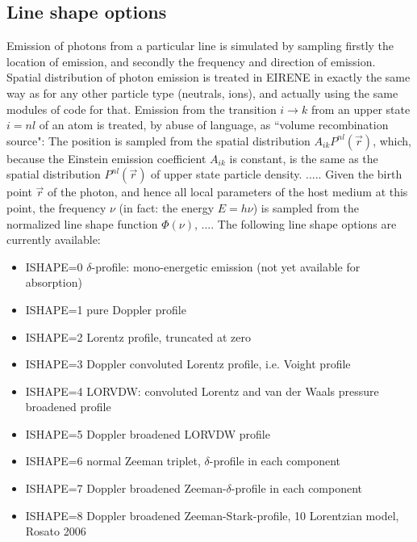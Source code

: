 \subsection{Line shape options}
Emission of photons from a particular line is simulated by sampling
firstly the location of emission, and secondly the frequency and direction of emission.
Spatial distribution of photon emission is treated in EIRENE in exactly the same way as
for any other particle type (neutrals, ions), and actually using the same modules of code for that.
Emission from the transition $i\rightarrow k$ from an upper state $i=nl$ of an atom is treated, by abuse  of language, as ``volume recombination
source": The position is sampled from the spatial distribution $A_{ik}P^{nl}(\vec{r})$, which, because the Einstein
emission coefficient $A_{ik}$ is constant, is the same as the spatial distribution $P^{nl}(\vec{r})$ of upper state particle density.
.....
Given the birth point $\vec{r}$ of the photon, and hence  all local parameters of the host medium at this point,
the frequency $\nu$ (in fact: the energy $E=h\nu$) is sampled from the normalized line shape function $\Phi(\nu)$,
....
The following line shape options are currently available:
\begin{itemize}
\item{ISHAPE=0} $\delta$-profile: mono-energetic emission (not yet available for absorption)
\item{ISHAPE=1} pure Doppler profile
\item{ISHAPE=2} Lorentz profile, truncated at zero
\item{ISHAPE=3} Doppler convoluted Lorentz  profile, i.e. Voight profile
\item{ISHAPE=4} LORVDW: convoluted Lorentz and van der Waals pressure broadened profile
\item{ISHAPE=5} Doppler broadened LORVDW profile
\item{ISHAPE=6} normal Zeeman triplet, $\delta$-profile in each component
\item{ISHAPE=7} Doppler broadened Zeeman-$\delta$-profile in each component
\item{ISHAPE=8} Doppler broadened Zeeman-Stark-profile, 10 Lorentzian model, Rosato 2006
\end{itemize}



\newpage
